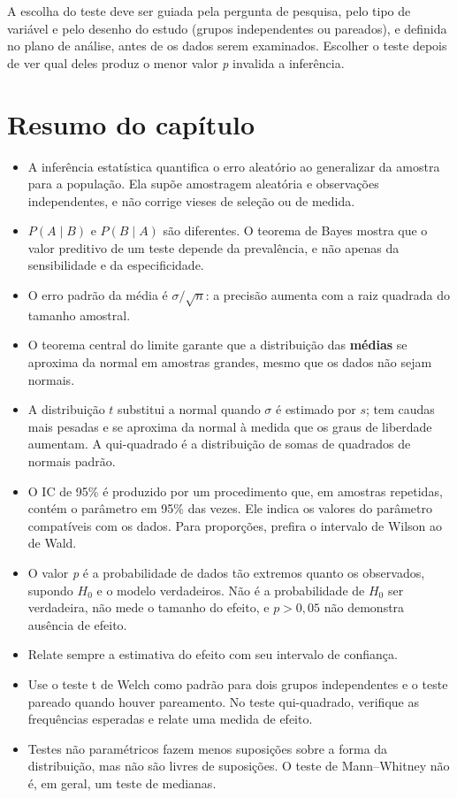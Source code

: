 \documentclass[
]{book}
\providecommand{\tightlist}{%
  \setlength{\itemsep}{0pt}\setlength{\parskip}{0pt}}
\begin{document}
A escolha do teste deve ser guiada pela pergunta de pesquisa, pelo tipo de variável e pelo desenho do estudo (grupos independentes ou pareados), e definida no plano de análise, antes de os dados serem examinados. Escolher o teste depois de ver qual deles produz o menor valor \emph{p} invalida a inferência.

\section{Resumo do capítulo}\label{resumo-do-capuxedtulo-4}

\begin{itemize}
\tightlist
\item
  A inferência estatística quantifica o erro aleatório ao generalizar da amostra para a população. Ela supõe amostragem aleatória e observações independentes, e não corrige vieses de seleção ou de medida.
\item
  \(P(A \mid B)\) e \(P(B \mid A)\) são diferentes. O teorema de Bayes mostra que o valor preditivo de um teste depende da prevalência, e não apenas da sensibilidade e da especificidade.
\item
  O erro padrão da média é \(\sigma/\sqrt{n}\): a precisão aumenta com a raiz quadrada do tamanho amostral.
\item
  O teorema central do limite garante que a distribuição das \textbf{médias} se aproxima da normal em amostras grandes, mesmo que os dados não sejam normais.
\item
  A distribuição \(t\) substitui a normal quando \(\sigma\) é estimado por \(s\); tem caudas mais pesadas e se aproxima da normal à medida que os graus de liberdade aumentam. A qui-quadrado é a distribuição de somas de quadrados de normais padrão.
\item
  O IC de 95\% é produzido por um procedimento que, em amostras repetidas, contém o parâmetro em 95\% das vezes. Ele indica os valores do parâmetro compatíveis com os dados. Para proporções, prefira o intervalo de Wilson ao de Wald.
\item
  O valor \emph{p} é a probabilidade de dados tão extremos quanto os observados, supondo \(H_0\) e o modelo verdadeiros. Não é a probabilidade de \(H_0\) ser verdadeira, não mede o tamanho do efeito, e \(p > 0{,}05\) não demonstra ausência de efeito.
\item
  Relate sempre a estimativa do efeito com seu intervalo de confiança.
\item
  Use o teste t de Welch como padrão para dois grupos independentes e o teste pareado quando houver pareamento. No teste qui-quadrado, verifique as frequências esperadas e relate uma medida de efeito.
\item
  Testes não paramétricos fazem menos suposições sobre a forma da distribuição, mas não são livres de suposições. O teste de Mann--Whitney não é, em geral, um teste de medianas.
\end{itemize}
\end{document}
